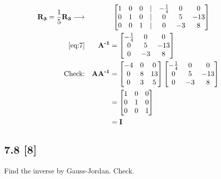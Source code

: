 \documentclass{article}
\begin{document}
\begin{align}
    \\
    \label{eq:7}
    \textbf{R\textsubscript{3}} = \frac{1}{5}\textbf{R\textsubscript{3}} \longrightarrow && &\text{ } \begin{bmatrix}
    1 & 0 & 0 &|& -\frac{1}{4} & 0 & 0\\
    0 & 1 & 0 &|& 0 & 5 & -13\\
    0 & 0 & 1 &|& 0 & -3 & 8
    \end{bmatrix}
    \\
    \label{eq:8}
    \eqref{eq:7} && \textbf{A\textsuperscript{-1}} &= \begin{bmatrix}
    -\frac{1}{4} & 0 & 0\\
    0 & 5 & -13\\
    0 & -3 & 8
    \end{bmatrix}
    \\
    \label{eq:9}
    \text{Check:} && \textbf{AA\textsuperscript{-1}} &= \begin{bmatrix}
    -4 & 0 & 0\\
    0 & 8 & 13\\
    0 & 3 & 5
    \end{bmatrix}\begin{bmatrix}
    -\frac{1}{4} & 0 & 0\\
    0 & 5 & -13\\
    0 & -3 & 8
    \end{bmatrix}
    \\
    \label{eq:10}
    && &=\begin{bmatrix}
    1&0&0\\
    0&1&0\\
    0&0&1
    \end{bmatrix}
    \\
    \label{eq:11}
    && &= \textbf{I}
\end{align}

\subsection*{7.8 [8]}
\setcounter{equation}{0}

Find the inverse by Gauss-Jordan. Check.
\end{document}
